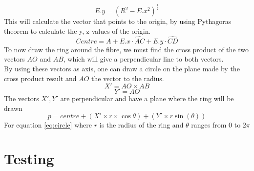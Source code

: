 \documentclass[12pt]{article} %
\begin{document}
\begin{flushleft}
\begin{equation}
E.y = (R^2 - E.x^2)^\frac{1}{2}
\end{equation}
This will calculate the vector that points to the origin, by using Pythagoras theorem to calculate the y, z values of the origin.
\vfill
\begin{equation} \label{eq:someequation}
Centre = A + E.x \cdot \hat{AC} + E.y \cdot \hat{CD}
\end{equation}
To now draw the ring around the fibre, we must find the cross product of the two vectors $AO$ and $AB$, which will give a perpendicular line to both vectors. \\
By using these vectors as axis, one can draw a circle on the plane made by the cross product result and $AO$ the vector to the radius.
\begin{equation} \label{eq:someequation}
X' = AO \times AB
\end{equation}
\begin{equation} \label{eq:someequation}
Y' = AO
\end{equation}
The vectors $X', Y'$ are perpendicular and have a plane where the ring will be drawn
\begin{equation} \label{eq:circle}
p = centre + (X' \times r \times \cos{\theta}) + (Y' \times r \sin(\theta))
\end{equation}
For equation \eqref{eq:circle} where $r$ is the radius of the ring and $\theta$ ranges from 0 to $2\pi$

\section{Testing}

\end{flushleft}
\end{document}
